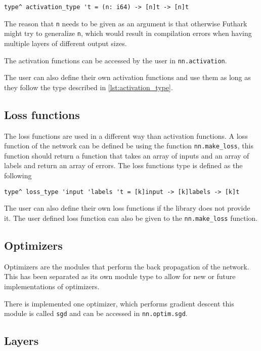 \begin{lstlisting}[caption=The type definition of activation functions., label={lst:activation_type}]
type^ activation_type 't = (n: i64) -> [n]t -> [n]t
\end{lstlisting}

The reason that \texttt{n} needs to be given as an argument is that otherwise Futhark might try to generalize \texttt{n}, which would result in compilation errors when having multiple layers of different output sizes.

The activation functions can be accessed by the user in \texttt{nn.activation}.

The user can also define their own activation functions and use them as long as they follow the type described in \autoref{lst:activation_type}.

\subsection{Loss functions}

The loss functions are used in a different way than activation functions. A loss function of the network can be defined be using the function \texttt{nn.make\_loss}, this function should return a function that takes an array of inputs and an array of labels and return an array of errors. The loss functions type is defined as the following

\begin{lstlisting}
type^ loss_type 'input 'labels 't = [k]input -> [k]labels -> [k]t
\end{lstlisting}

The user can also define their own loss functions if the library does not provide it. The user defined loss function can also be given to the \texttt{nn.make\_loss} function.

\subsection{Optimizers}

Optimizers are the modules that perform the back propagation of the network.
This has been separated as its own module type to allow for new or future implementations of optimizers.

There is implemented one optimizer, which performs gradient descent this module is called \texttt{sgd} and can be accessed in \texttt{nn.optim.sgd}.

\subsection{Layers}%
\label{sub:layers}

